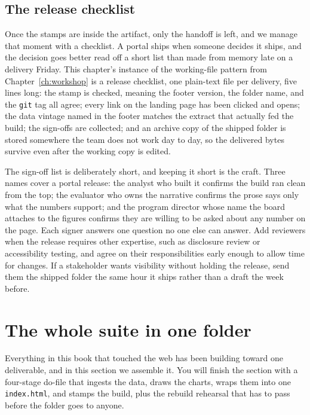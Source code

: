 \subsection{The release checklist}\label{ch12-sc-release}
Once the stamps are inside the artifact, only the handoff is left, and we manage that moment with a checklist. A portal ships when someone decides it ships, and the decision goes better read off a short list than made from memory late on a delivery Friday. This chapter's instance of the working-file pattern from Chapter~\ref{ch:workshop} is a release checklist, one plain-text file per delivery, five lines long: the stamp is checked, meaning the footer version, the folder name, and the \texttt{git} tag all agree; every link on the landing page has been clicked and opens; the data vintage named in the footer matches the extract that actually fed the build; the sign-offs are collected; and an archive copy of the shipped folder is stored somewhere the team does not work day to day, so the delivered bytes survive even after the working copy is edited.

The sign-off list is deliberately short, and keeping it short is the craft. Three names cover a portal release: the analyst who built it confirms the build ran clean from the top; the evaluator who owns the narrative confirms the prose says only what the numbers support; and the program director whose name the board attaches to the figures confirms they are willing to be asked about any number on the page. Each signer answers one question no one else can answer. Add reviewers when the release requires other expertise, such as disclosure review or accessibility testing, and agree on their responsibilities early enough to allow time for changes. If a stakeholder wants visibility without holding the release, send them the shipped folder the same hour it ships rather than a draft the week before.

\section{The whole suite in one folder}\label{sec:capstone}
Everything in this book that touched the web has been building toward one deliverable, and in this section we assemble it. You will finish the section with a four-stage do-file that ingests the data, draws the charts, wraps them into one \texttt{index.html}, and stamps the build, plus the rebuild rehearsal that has to pass before the folder goes to anyone.

